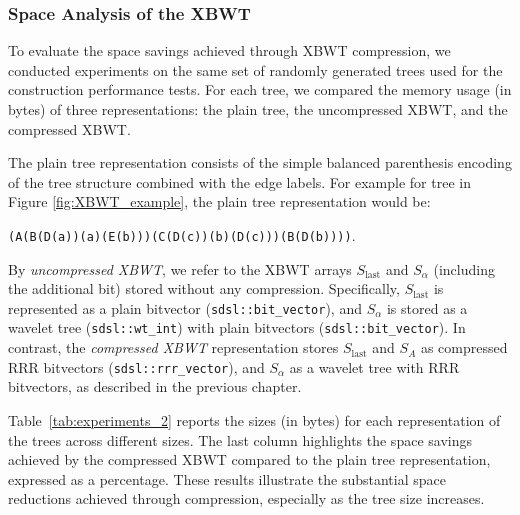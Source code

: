 \subsubsection{Space Analysis of the XBWT}
To evaluate the space savings achieved through XBWT compression, we conducted experiments on the same set of randomly generated trees used for the construction performance tests. For each tree, we compared the memory usage (in bytes) of three representations: the plain tree, the uncompressed XBWT, and the compressed XBWT.

The plain tree representation consists of the simple balanced parenthesis encoding of the tree structure combined with the edge labels. For example for tree in Figure \ref{fig:XBWT_example}, the plain tree representation would be:

\texttt{(A(B(D(a))(a)(E(b)))(C(D(c))(b)(D(c)))(B(D(b))))}.

By \emph{uncompressed XBWT}, we refer to the XBWT arrays $S_{\text{last}}$ and $S_{\alpha}$ (including the additional bit) stored without any compression. Specifically, $S_{\text{last}}$ is represented as a plain bitvector (\texttt{sdsl::bit\_vector}), and $S_{\alpha}$ is stored as a wavelet tree (\texttt{sdsl::wt\_int}) with plain bitvectors (\texttt{sdsl::bit\_vector}). In contrast, the \emph{compressed XBWT} representation stores $S_{\text{last}}$ and $S_{A}$ as compressed RRR bitvectors (\texttt{sdsl::rrr\_vector}), and $S_{\alpha}$ as a wavelet tree with RRR bitvectors, as described in the previous chapter.

Table~\ref{tab:experiments_2} reports the sizes (in bytes) for each representation of the trees across different sizes. The last column highlights the space savings achieved by the compressed XBWT compared to the plain tree representation, expressed as a percentage. These results illustrate the substantial space reductions achieved through compression, especially as the tree size increases.


